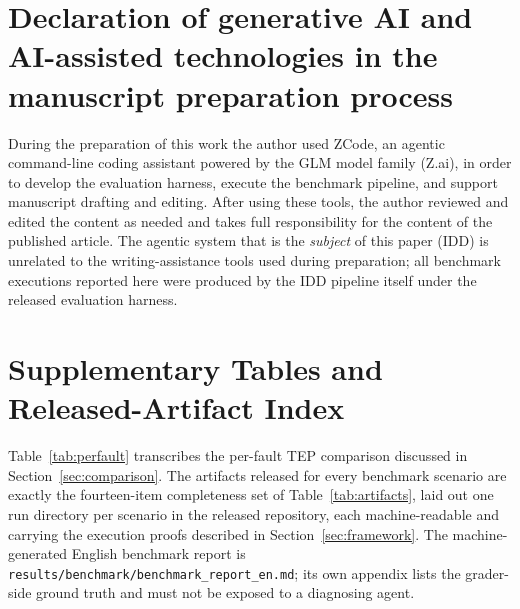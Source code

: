 \documentclass[preprint,10pt]{elsarticle}
\begin{document}
\section*{Declaration of generative AI and AI-assisted technologies in the manuscript preparation process}
During the preparation of this work the author used ZCode, an agentic command-line coding assistant powered by the GLM model family (Z.ai), in order to develop the evaluation harness, execute the benchmark pipeline, and support manuscript drafting and editing. After using these tools, the author reviewed and edited the content as needed and takes full responsibility for the content of the published article. The agentic system that is the \emph{subject} of this paper (IDD) is unrelated to the writing-assistance tools used during preparation; all benchmark executions reported here were produced by the IDD pipeline itself under the released evaluation harness.




\appendix

\section{Supplementary Tables and Released-Artifact Index}\label{app:artifacts}

\setcounter{table}{0}
\renewcommand{\thetable}{A\arabic{table}}
\renewcommand{\theHtable}{A\arabic{table}}

Table~\ref{tab:perfault} transcribes the per-fault TEP comparison discussed in
Section~\ref{sec:comparison}. The artifacts released for every benchmark scenario are exactly
the fourteen-item completeness set of Table~\ref{tab:artifacts}, laid out one run directory
per scenario in the released repository, each machine-readable and carrying the execution
proofs described in Section~\ref{sec:framework}. The machine-generated English benchmark
report is \texttt{results/benchmark/benchmark\_report\_en.md}; its own appendix lists the
grader-side ground truth and must not be exposed to a diagnosing agent.
\end{document}
